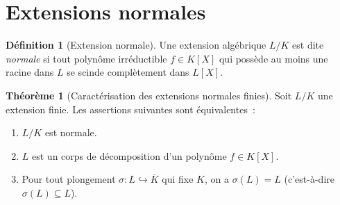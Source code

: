 \documentclass[12pt,a4paper,openany]{book}
\theoremstyle{definition}
\newtheorem{definition}{Définition}[chapter]
\newtheorem{theoreme}{Théorème}[chapter]
\begin{document}
\section{Extensions normales}\label{sec:extensions-normales}

\begin{definition}[Extension normale]\label{def:extension-normale}
Une extension algébrique $L/K$ est dite \emph{normale} si tout polynôme
irréductible $f \in K[X]$ qui possède au moins une racine dans $L$ se
scinde complètement dans $L[X]$.
\end{definition}

\begin{theoreme}[Caractérisation des extensions normales finies]\label{thm:normale-splitting}
Soit $L/K$ une extension finie. Les assertions suivantes sont équivalentes~:
\begin{enumerate}[label=(\roman*)]
  \item $L/K$ est normale.
  \item $L$ est un corps de décomposition d'un polynôme $f \in K[X]$.
  \item Pour tout plongement $\sigma \colon L \hookrightarrow \overline{K}$
    qui fixe $K$, on a $\sigma(L) = L$ (c'est-à-dire $\sigma(L) \subseteq L$).
\end{enumerate}
\end{theoreme}
\end{document}
